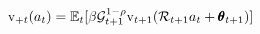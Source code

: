   \begin{equation}\begin{gathered}\begin{aligned}
        \vEndStge({a}_{\stge})  & = \Ex_{\stge}[\DiscFac \PermGroFac_{\stge+1}^{1-\CRRA}\null{\vFunc}_{\stge+1}(\RNrm_{\stge+1} {a}_{\stge}+{\TranShkEmp}_{\stge+1})]  \label{eq:vEndtdefn}
      \end{aligned}\end{gathered}\end{equation}
